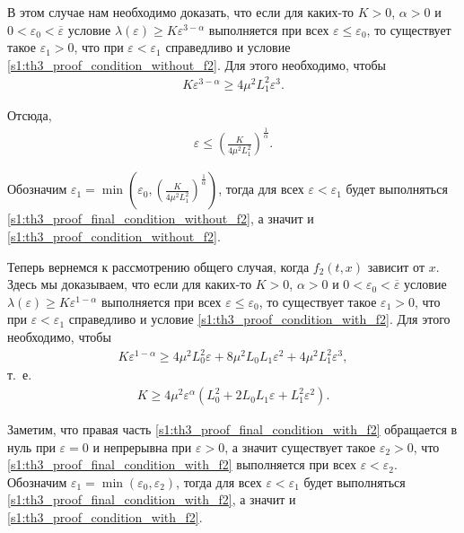 \documentclass[../main.tex]{subfiles}
\begin{document}
В этом случае нам необходимо доказать, что если для каких-то $K > 0$, $\alpha > 0$ и $ 0 < \varepsilon_0 < \overline{\varepsilon}$ условие $ \lambda(\varepsilon) \geqslant K\varepsilon ^{3 - \alpha} $ выполняется при всех $\varepsilon \leqslant \varepsilon_0$, то существует такое $ \varepsilon_1 > 0 $, что при $\varepsilon < \varepsilon_1 $ справедливо и условие \eqref{s1:th3_proof_condition_without_f2}.
Для этого необходимо, чтобы 
\begin{gather}\label{s1:th3_proof_final_condition_without_f2}
	K\varepsilon ^{3 - \alpha} \geqslant 4 \mu^2 L_1^2 \varepsilon^3.
\end{gather}

 Отсюда,
 \begin{gather*}
 	\varepsilon \leqslant \left(\frac{K}{4 \mu^2 L_1^2}\right)^{\frac{1}{\alpha}}.
 \end{gather*}
 
 Обозначим $\varepsilon_1 = \min \left(\varepsilon_0, \left(\frac{K}{4 \mu^2 L_1^2}\right)^{\frac{1}{\alpha}} \right) $, тогда для всех $\varepsilon < \varepsilon_1 $ будет выполняться \eqref{s1:th3_proof_final_condition_without_f2}, а значит и \eqref{s1:th3_proof_condition_without_f2}.
 

Теперь вернемся к рассмотрению общего случая, когда $f_2(t,x)$ зависит от $x$.
Здесь мы доказываем, что если для каких-то $K > 0$, $\alpha > 0$ и $ 0 < \varepsilon_0 < \overline{\varepsilon}$ условие $ \lambda(\varepsilon) \geqslant K\varepsilon ^{1 - \alpha} $ выполняется при всех $\varepsilon \leqslant \varepsilon_0$, то существует такое $ \varepsilon_1 > 0 $, что при $\varepsilon < \varepsilon_1 $ справедливо и условие \eqref{s1:th3_proof_condition_with_f2}. 
Для этого необходимо, чтобы 
\begin{gather*}
	K\varepsilon ^{1 - \alpha} \geqslant 4 \mu^2 L_0^2 \varepsilon + 8 \mu^2 L_0 L_1 \varepsilon^2 + 4 \mu^2 L_1^2 \varepsilon^3,
\end{gather*}
т.~е. 
\begin{gather}\label{s1:th3_proof_final_condition_with_f2}
	K \geqslant 4 \mu^2 \varepsilon^{\alpha} (L_0^2 + 2 L_0 L_1 \varepsilon + L_1^2 \varepsilon^2).
\end{gather}
 
 Заметим, что правая часть \eqref{s1:th3_proof_final_condition_with_f2} обращается в нуль при $\varepsilon = 0$ и непрерывна при $\varepsilon > 0$, а значит существует такое $\varepsilon_2 > 0$, что \eqref{s1:th3_proof_final_condition_with_f2} выполняется при всех $\varepsilon < \varepsilon_2 $.
 Обозначим $\varepsilon_1 = \min \left(\varepsilon_0, \varepsilon_2\right) $, тогда для всех $\varepsilon < \varepsilon_1 $ будет выполняться \eqref{s1:th3_proof_final_condition_with_f2}, а значит и \eqref{s1:th3_proof_condition_with_f2}.
 
\end{document}
